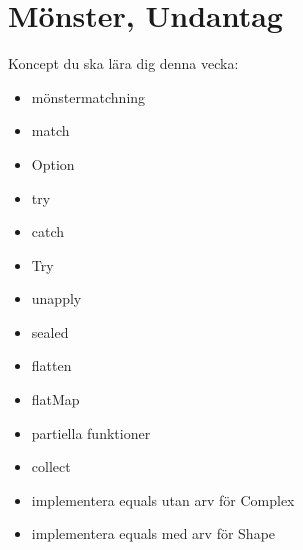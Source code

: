 \chapter{Mönster, Undantag}\label{chapter:W08}
Koncept du ska lära dig denna vecka:
\begin{multicols}{2}\begin{itemize}[nosep,label={$\square$},leftmargin=*]
\item mönstermatchning
\item match
\item Option
\item try
\item catch
\item Try
\item unapply
\item sealed
\item flatten
\item flatMap
\item partiella funktioner
\item collect
\item implementera equals utan arv för Complex
\item implementera equals med arv för Shape\end{itemize}\end{multicols}
